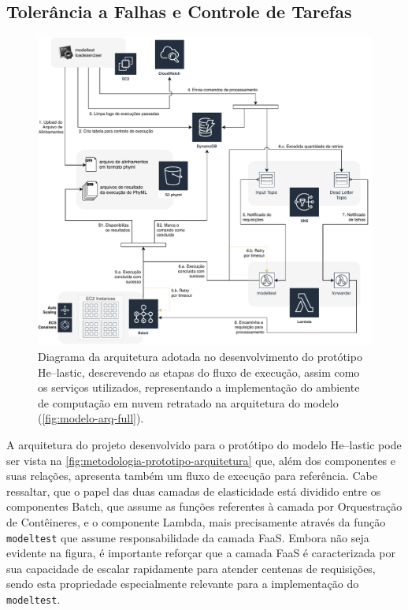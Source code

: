 \documentclass[english,brazilian]{UNISINOSmonografia} %
\newcommand\defaultFigureWidth{0.9}
\begin{document}
\subsection{Tolerância a Falhas e Controle de Tarefas}


\begin{figure}[tp]
	\centering%
	\begin{minipage}{\defaultFigureWidth\textwidth}
		\caption{Diagrama da arquitetura adotada no desenvolvimento do protótipo \textsf{He}--lastic, descrevendo as etapas do fluxo de execução, assim como os serviços utilizados, representando a implementação do ambiente de computação em nuvem retratado na arquitetura do modelo (\autoref{fig:modelo-arq-full}).}
		\label{fig:metodologia-prototipo-arquitetura}
		\vspace{1ex}
		\includegraphics[width=\textwidth]{prototipo-arquitetura}
	\end{minipage}
\end{figure}


A arquitetura do projeto desenvolvido para o protótipo do modelo \textsf{He}--lastic pode ser vista na \autoref{fig:metodologia-prototipo-arquitetura} que, além dos componentes e suas relações, apresenta também um fluxo de execução para referência.
%
Cabe ressaltar, que o papel das duas camadas de elasticidade está dividido entre os componentes Batch, que assume as funções referentes à camada por Orquestração de Contêineres, e o componente Lambda, mais precisamente através da função \texttt{modeltest} que assume responsabilidade da camada FaaS.
%
Embora não seja evidente na figura, é importante reforçar que a camada FaaS é caracterizada por sua capacidade de escalar rapidamente para atender centenas de requisições, sendo esta propriedade especialmente relevante para a implementação do \texttt{modeltest}.
\end{document}
